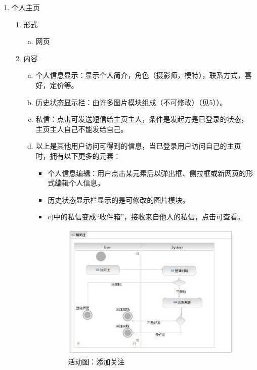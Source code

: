 \documentclass[a4paper,14pt]{ctexart}
\begin{document}
\begin{enumerate}[1)]
\begin{enumerate}[i]
\begin{enumerate}[a)]
	\end{enumerate}
\end{enumerate}



\item 个人主页
\begin{enumerate}[i]
\item 形式
	\begin{enumerate}[a)]
	\item 网页

	\end{enumerate}

\item 内容
 	\begin{enumerate}[a)]
		\item 个人信息显示：显示个人简介，角色（摄影师，模特），联系方式，喜好，定价等。
\item 历史状态显示栏：由许多图片模块组成（不可修改）（见5））。
\item 私信：点击可发送短信给主页主人，条件是发起方是已登录的状态，主页主人自己不能发给自己。
\item 以上是其他用户访问可得到的信息，当已登录用户访问自己的主页时，拥有以下更多的元素：
\begin{itemize}
\item 个人信息编辑：用户点击某元素后以弹出框、侧拉框或新网页的形式编辑个人信息。
\item 历史状态显示栏显示的是可修改的图片模块。
\item c)中的私信变成“收件箱”，接收来自他人的私信，点击可查看。

\begin{figure}[H]
\centering\includegraphics[width=4.5in]{活动图-加关注.jpeg}
\caption{活动图：添加关注}
\label{fig:13}
\end{figure}


\end{itemize}
\end{enumerate}
\end{enumerate}
\end{enumerate}
\end{document}
